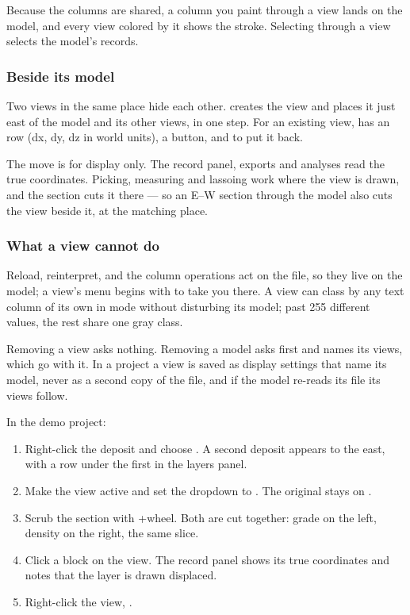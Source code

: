 Because the columns are shared, a column you paint through a view lands on the model, and every view colored by it shows the stroke. Selecting through a view selects the model's records.

\subsubsection{Beside its model}
Two views in the same place hide each other.  creates the view and places it just east of the model and its other views, in one step. For an existing view,  has an  row (dx, dy, dz in world units), a  button, and  to put it back.

The move is for display only. The record panel, exports and analyses read the true coordinates. Picking, measuring and lassoing work where the view is drawn, and the section cuts it there — so an E–W section through the model also cuts the view beside it, at the matching place.

\subsubsection{What a view cannot do}
Reload, reinterpret,  and the column operations act on the file, so they live on the model; a view's menu begins with  to take you there. A view can class by any text column of its own in  mode without disturbing its model; past 255 different values, the rest share one gray class.

Removing a view asks nothing. Removing a model asks first and names its views, which go with it. In a project a view is saved as display settings that name its model, never as a second copy of the file, and if the model re-reads its file its views follow.

\begin{tryit}
In the demo project:
\begin{enumerate}
\item Right-click the deposit and choose . A second deposit appears to the east, with a  row under the first in the layers panel.
\item Make the view active and set the  dropdown to . The original stays on .
\item Scrub the section with +wheel. Both are cut together: grade on the left, density on the right, the same slice.
\item Click a block on the view. The record panel shows its true coordinates and notes that the layer is drawn displaced.
\item Right-click the view, .
\end{enumerate}
\end{tryit}

